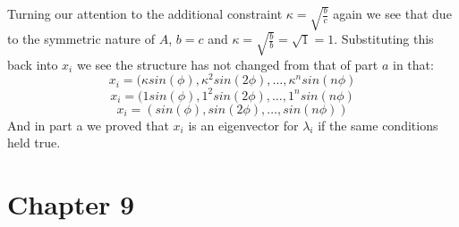 \documentclass[11pt,a4paper]{article}
\begin{document}
\begin{itemize}
\begin{enumerate} [label={\alph*)}]
					Turning our attention to the additional constraint $\kappa=\sqrt{\frac{b}{c}}$ again we see that due to the symmetric nature of $A$, $b=c$ and $\kappa=\sqrt{\frac{b}{b}} = \sqrt{1} = 1$. Substituting this back into $x_i$ we see the structure has not changed from that of part $a$ in that:
					$$x_i = (\kappa sin(\phi), \kappa^2 sin(2\phi), \dots, \kappa^n sin(n\phi)$$
					$$x_i = (1 sin(\phi), 1^2 sin(2\phi), \dots, 1^n sin(n\phi)$$
					$$x_i = (sin(\phi),sin(2\phi), \dots,sin(n\phi))$$
					And in part a we proved that $x_i$ is an eigenvector for $\lambda_i$ if the same conditions held true.
				\end{enumerate}
		\end{itemize}
		
	\section{Chapter 9}
\end{document}
